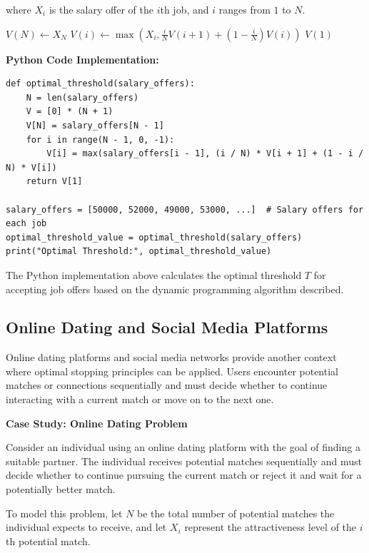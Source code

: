 \documentclass[12pt]{book} %
\begin{document}
where \(X_i\) is the salary offer of the \(i\)th job, and \(i\) ranges from \(1\) to \(N\).
\FloatBarrier
\begin{algorithm}
\caption{Dynamic Programming Algorithm for Job Offer Problem}\label{alg:job_offer}
\begin{algorithmic}[1]
\State $V(N) \gets X_N$
    \State $V(i) \gets \max(X_i, \frac{i}{N}V(i+1) + \left(1 - \frac{i}{N}\right)V(i))$
\EndFor
\State \Return $V(1)$
\EndFunction
\end{algorithmic}
\end{algorithm}
\FloatBarrier
\textbf{Python Code Implementation:}
\FloatBarrier
\begin{lstlisting}
def optimal_threshold(salary_offers):
    N = len(salary_offers)
    V = [0] * (N + 1)
    V[N] = salary_offers[N - 1]
    for i in range(N - 1, 0, -1):
        V[i] = max(salary_offers[i - 1], (i / N) * V[i + 1] + (1 - i / N) * V[i])
    return V[1]

salary_offers = [50000, 52000, 49000, 53000, ...]  # Salary offers for each job
optimal_threshold_value = optimal_threshold(salary_offers)
print("Optimal Threshold:", optimal_threshold_value)
\end{lstlisting}
\FloatBarrier
The Python implementation above calculates the optimal threshold \(T\) for accepting job offers based on the dynamic programming algorithm described.

\subsection{Online Dating and Social Media Platforms}

Online dating platforms and social media networks provide another context where optimal stopping principles can be applied. Users encounter potential matches or connections sequentially and must decide whether to continue interacting with a current match or move on to the next one.

\textbf{Case Study: Online Dating Problem}

Consider an individual using an online dating platform with the goal of finding a suitable partner. The individual receives potential matches sequentially and must decide whether to continue pursuing the current match or reject it and wait for a potentially better match.

To model this problem, let \(N\) be the total number of potential matches the individual expects to receive, and let \(X_i\) represent the attractiveness level of the \(i\)th potential match.
\end{document}
